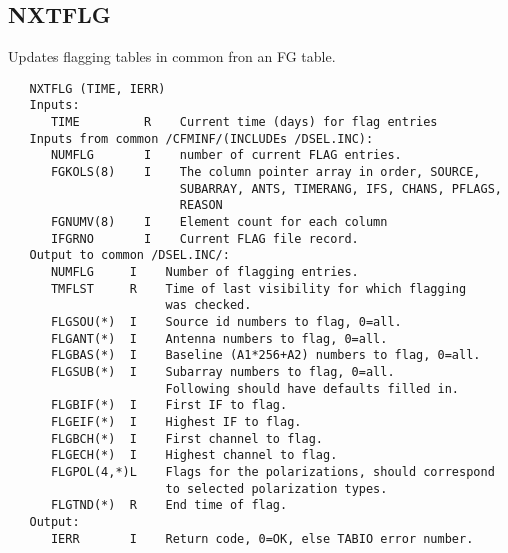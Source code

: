 \subsection{NXTFLG}
Updates flagging tables in common fron an FG table.
\begin{verbatim}
   NXTFLG (TIME, IERR)
   Inputs:
      TIME         R    Current time (days) for flag entries
   Inputs from common /CFMINF/(INCLUDEs /DSEL.INC):
      NUMFLG       I    number of current FLAG entries.
      FGKOLS(8)    I    The column pointer array in order, SOURCE,
                        SUBARRAY, ANTS, TIMERANG, IFS, CHANS, PFLAGS,
                        REASON
      FGNUMV(8)    I    Element count for each column
      IFGRNO       I    Current FLAG file record.
   Output to common /DSEL.INC/:
      NUMFLG     I    Number of flagging entries.
      TMFLST     R    Time of last visibility for which flagging
                      was checked.
      FLGSOU(*)  I    Source id numbers to flag, 0=all.
      FLGANT(*)  I    Antenna numbers to flag, 0=all.
      FLGBAS(*)  I    Baseline (A1*256+A2) numbers to flag, 0=all.
      FLGSUB(*)  I    Subarray numbers to flag, 0=all.
                      Following should have defaults filled in.
      FLGBIF(*)  I    First IF to flag.
      FLGEIF(*)  I    Highest IF to flag.
      FLGBCH(*)  I    First channel to flag.
      FLGECH(*)  I    Highest channel to flag.
      FLGPOL(4,*)L    Flags for the polarizations, should correspond
                      to selected polarization types.
      FLGTND(*)  R    End time of flag.
   Output:
      IERR       I    Return code, 0=OK, else TABIO error number.
\end{verbatim}

